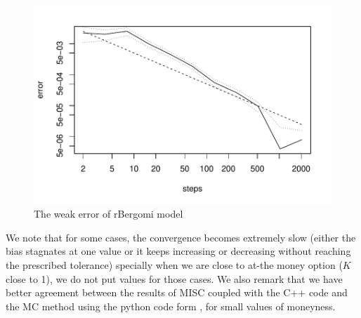 \documentclass[11pt]{article}
\begin{document}
\begin{figure}[!h]
	\begin{center}
		\includegraphics[scale=0.5]{./figures/rBergomi_weak_error/weak_RT.pdf}
		\caption{The weak error of rBergomi model}
		\label{fig:rBergomi_weak_error}
	\end{center}
\end{figure}

We note that for some cases, the convergence becomes extremely slow (either the bias stagnates at one value or it keeps increasing or decreasing without reaching the prescribed tolerance) specially when we are close to at-the money option ($K$ close to 1), we do not put values for those cases. We also remark that we have better agreement between the results of MISC coupled with the C++ code and the MC method using the python code form \cite{mccrickerd2017turbocharging}, for small values of moneyness.
\end{document}
